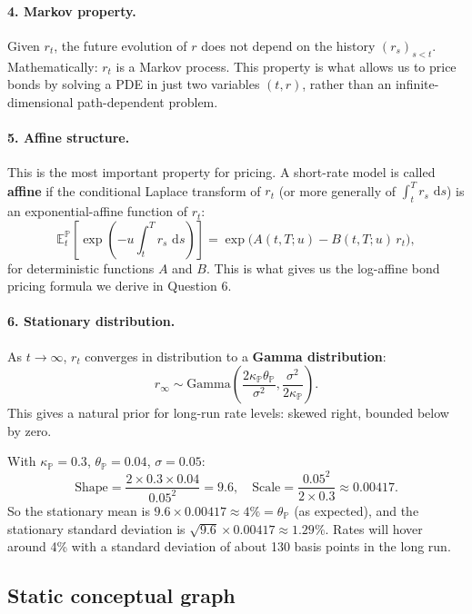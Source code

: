 \documentclass[11pt]{article}
\newcommand{\PP}{\mathbb{P}}
\newcommand{\EE}{\mathbb{E}}
\newcommand{\dd}{\,\mathrm{d}}
\begin{document}
\paragraph{4. Markov property.}  Given $r_t$, the future evolution of $r$
does not depend on the history $(r_s)_{s<t}$.  Mathematically: $r_t$ is a
Markov process.  This property is what allows us to price bonds by solving
a PDE in just two variables $(t, r)$, rather than an infinite-dimensional
path-dependent problem.

\paragraph{5. Affine structure.}  This is the most important property for
pricing.  A short-rate model is called \textbf{affine} if the conditional
Laplace transform of $r_t$ (or more generally of $\int_t^T r_s\,\dd s$)
is an exponential-affine function of $r_t$:
\[
\EE_t^\PP\!\left[\exp\!\left(-u \int_t^T r_s\,\dd s\right)\right]
= \exp\!\big(A(t,T;u) - B(t,T;u)\,r_t\big),
\]
for deterministic functions $A$ and $B$.  This is what gives us the
log-affine bond pricing formula we derive in Question 6.

\paragraph{6. Stationary distribution.}  As $t\to\infty$, $r_t$ converges
in distribution to a \textbf{Gamma distribution}:
\[
r_\infty \sim \mathrm{Gamma}\!\left(
\frac{2\kappa_\PP\theta_\PP}{\sigma^2}, \frac{\sigma^2}{2\kappa_\PP}
\right).
\]
This gives a natural prior for long-run rate levels: skewed right,
bounded below by zero.

\begin{example_box}
With $\kappa_\PP=0.3$, $\theta_\PP=0.04$, $\sigma=0.05$:
\[
\text{Shape} = \frac{2\times 0.3 \times 0.04}{0.05^2} = 9.6,
\quad
\text{Scale} = \frac{0.05^2}{2\times 0.3} \approx 0.00417.
\]
So the stationary mean is $9.6 \times 0.00417 \approx 4\% = \theta_\PP$
(as expected), and the stationary standard deviation is
$\sqrt{9.6}\times 0.00417 \approx 1.29\%$.  Rates will hover around 4\%
with a standard deviation of about 130 basis points in the long run.
\end{example_box}

\subsection{Static conceptual graph}
\end{document}
